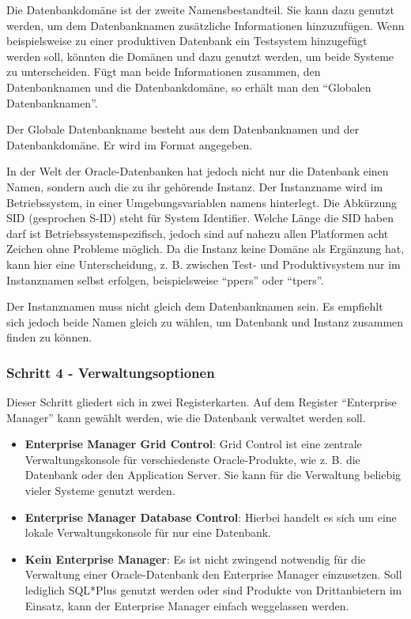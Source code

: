           Die Datenbankdomäne ist der zweite Namensbestandteil. Sie kann dazu genutzt werden, um dem Datenbanknamen zusätzliche Informationen hinzuzufügen. Wenn beispielsweise zu einer produktiven Datenbank ein Testsystem hinzugefügt werden soll, könnten die Domänen  und  dazu genutzt werden, um beide Systeme zu unterscheiden. Fügt man beide Informationen zusammen, den Datenbanknamen und die Datenbankdomäne, so erhält man den \enquote{Globalen Datenbanknamen}.

          \begin{merke}
            Der Globale Datenbankname besteht aus dem Datenbanknamen und der Datenbankdomäne. Er wird im Format  angegeben.
          \end{merke}
          In der Welt der Oracle-Datenbanken hat jedoch nicht nur die Datenbank einen Namen, sondern auch die zu ihr gehörende Instanz. Der Instanzname wird im Betriebssystem, in einer Umgebungsvariablen namens  hinterlegt. Die Abkürzung SID (gesprochen S-ID) steht für System Identifier. Welche Länge die SID haben darf ist Betriebssystemspezifisch, jedoch sind auf nahezu allen Platformen acht Zeichen ohne Probleme möglich. Da die Instanz keine Domäne als Ergänzung hat, kann hier eine Unterscheidung, z. B. zwischen Test- und Produktivsystem nur im Instanznamen selbst erfolgen, beispielsweise \enquote{ppers} oder \enquote{tpers}.

          \begin{merke}
            Der Instanznamen muss nicht gleich dem Datenbanknamen sein. Es empfiehlt sich jedoch beide Namen gleich zu wählen, um Datenbank und Instanz zusammen finden zu können.
          \end{merke}
        \subsubsection{Schritt 4 - Verwaltungsoptionen}
          Dieser Schritt gliedert sich in zwei Registerkarten. Auf dem Register \enquote{Enterprise Manager} kann gewählt werden, wie die Datenbank verwaltet werden soll.
          \begin{itemize}
            \item \textbf{Enterprise Manager Grid Control}: Grid Control ist eine zentrale Verwaltungskonsole für verschiedenste Oracle-Produkte, wie z. B. die Datenbank oder den Application Server. Sie kann für die Verwaltung beliebig vieler Systeme genutzt werden.
            \item \textbf{Enterprise Manager Database Control}: Hierbei handelt es sich um eine lokale Verwaltungskonsole für nur eine Datenbank.
            \item \textbf{Kein Enterprise Manager}: Es ist nicht zwingend notwendig für die Verwaltung einer Oracle-Datenbank den Enterprise Manager einzusetzen. Soll lediglich SQL*Plus genutzt werden oder sind Produkte von Drittanbietern im Einsatz, kann der Enterprise Manager einfach weggelassen werden.
          \end{itemize}

